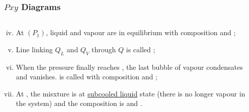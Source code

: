 \documentclass[10pt,compress,unknownkeysallowed]{beamer}
\begin{document}
\begin{frame}
  \frametitle{$Pxy$ Diagrams}
  \begin{columns}
     \begin{column}[l]{0.5\linewidth}
       \begin{enumerate}[i)]\setcounter{enumi}{3}
          \item<1-> At  $\left(P_{1}\right)$, liquid and vapour are in equilibrium with composition \red{$\left[x_{1}=x_{\text{Q}}; y_{1}=y_{\text{Q}}\right]$} and \blue{$\left[x_{2}=1-x_{1}; y_{2}=1-y_{1}\right]$};
          \item<2-> Line linking $Q_{L}$ and $Q_{V}$ through $Q$ is called {\bf {}};
          \item<3-> When the pressure finally reaches , the last bubble of vapour condensates and vanishes.  is called {\bf {}} with composition \red{$\left[x_{1}=x_{\text{z}}; y_{1}=y_{\text{BP}}\right]$} and \blue{$\left[x_{2}=1-x_{1}; y_{2}=1-y_{1}\right]$};
          \item<4-> At , the misxture is at \underline{subcooled liquid} state (\ie there is no longer vapour in the system) and the composition is \red{$\left[x_{1}=x_{\text{z}}; y_{1}=0\right]$} and \blue{$\left[x_{2}=1-x_{1}; y_{2}=0\right]$}.
       \end{enumerate}
     \end{column}
     \begin{column}[l]{0.5\linewidth} 
     \end{column}
  \end{columns}
\end{frame}
\normalsize
\end{document}
